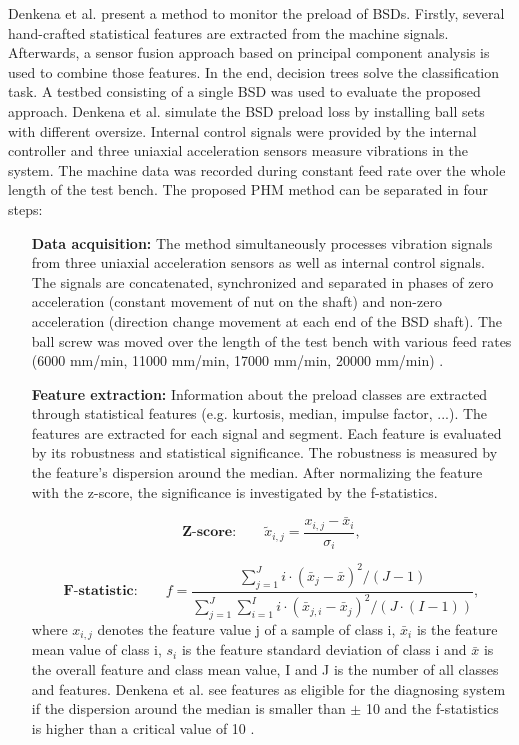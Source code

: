 Denkena et al. \cite{Denkena2021} present a method to monitor the preload of BSDs. Firstly, several hand-crafted statistical features are extracted from the machine signals. Afterwards, a sensor fusion approach based on principal component analysis is used to combine those features. In the end, decision trees solve the classification task. A testbed consisting of a single BSD was used to evaluate the proposed approach. Denkena et al. simulate the BSD preload loss by installing ball sets with different oversize. Internal control signals were provided by the internal controller and three uniaxial acceleration sensors measure vibrations in the system. The machine data was recorded during constant feed rate over the whole length of the test bench. The proposed PHM method can be separated in four steps:

\begin{itemize}
    \item [\textbf{Data acquisition:}] The method simultaneously processes vibration signals from three uniaxial acceleration sensors as well as internal control signals. The signals are concatenated, synchronized and separated in phases of zero acceleration (constant movement of nut on the shaft) and non-zero acceleration (direction change movement at each end of the BSD shaft). The ball screw was moved over the length of the test bench with various feed rates (6000 mm/min, 11000 mm/min, 17000 mm/min, 20000 mm/min) \cite{Denkena2021}.
    \item [\textbf{Feature extraction:}] Information about the preload classes are extracted through statistical features (e.g. kurtosis, median, impulse factor, ...). The features are extracted for each signal and segment. Each feature is evaluated by its robustness and statistical significance. The robustness is measured by the feature's dispersion around the median. After normalizing the feature with the z-score, the significance is investigated by the f-statistics.
    
    \begin{equation}
        \textbf{Z-score:}\qquad \tilde{x}_{i,j} = \frac{x_{i,j} - \bar x_{i}}{\sigma_{i}},
    \end{equation}
    
    \begin{equation}
        \textbf{F-statistic:}\qquad f = \frac{\sum_{j=1}^{J} i \cdot (\bar x_{j} -\bar x)^{2}/(J-1)}{\sum_{j=1}^{J} \sum_{i=1}^{I} i \cdot (\bar x_{j,i} -\bar x_{j})^{2}/(J \cdot (I-1))},
    \end{equation}
    where ${x}_{i,j}$ denotes the feature value j of a sample of class i, $\bar{x}_{i}$ is the feature mean value of class i, ${s}_{i}$ is the feature standard deviation of class i and $\bar{x}$ is the overall feature and class mean value, I and J is the number of all classes and features. Denkena et al. see features as eligible for the diagnosing system if the dispersion around the median is smaller than $\pm$ 10 and the f-statistics is higher than a critical value of 10 \cite{Denkena2021}. 
    

\end{itemize}
